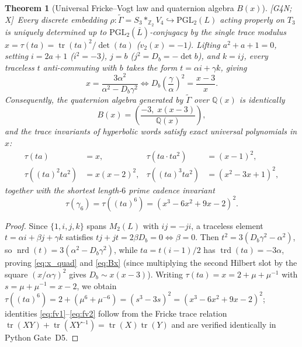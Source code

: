 \documentclass[11pt]{amsart}
\numberwithin{equation}{section}
\theoremstyle{plain}
\newtheorem{theorem}{Theorem}[section]
\theoremstyle{definition}\newtheorem{definition}[theorem]{Definition}
\theoremstyle{remark}\newtheorem{remark}[theorem]{Remark}
\newcommand{\Q}{\mathbb{Q}}
\newcommand{\Z}{\mathbb{Z}}
\newcommand{\PGL}{\mathrm{PGL}}
\newcommand{\nrd}{\operatorname{nrd}}
\newcommand{\trd}{\operatorname{trd}}
\newcommand{\ctag}[1]{\textup{\textsf{\scriptsize[#1]}}}
\begin{document}
\begin{theorem}[Universal Fricke--Vogt law and quaternion algebra $B(x)$]\label{thm:fricke_vogt}
\ctag{G4N; X}\ Every discrete embedding $\rho:\tilde{\Gamma}=S_3*_{\Z_2}V_4\hookrightarrow\PGL_2(L)$ acting properly on $T_3$ is uniquely determined up to $\PGL_2(\overline{L})$-conjugacy by the single trace modulus $x = \tau(ta) = \operatorname{tr}(ta)^2/\det(ta)$ ($v_2(x)=-1$). Lifting $a^2+a+1=0$, setting $i=2a+1$ ($i^2=-3$), $j=b$ ($j^2=D_b=-\det b$), and $k=ij$, every traceless $t$ anti-commuting with $b$ takes the form $t=\alpha i + \gamma k$, giving
\begin{equation}\label{eq:x_quad}
x = \frac{3\alpha^2}{\alpha^2 - D_b \gamma^2} \iff D_b\left(\frac{\gamma}{\alpha}\right)^2 = \frac{x - 3}{x}.
\end{equation}
Consequently, the quaternion algebra generated by $\tilde{\Gamma}$ over $\Q(x)$ is identically
\begin{equation}\label{eq:Bx}
B(x) = \left(\frac{-3,\; x(x-3)}{\Q(x)}\right),
\end{equation}
and the trace invariants of hyperbolic words satisfy exact universal polynomials in $x$:
\begin{align}
\tau(ta) &= x, & \tau(ta\cdot ta^2) &= (x-1)^2, \label{eq:fv1}\\
\tau((ta)^2 ta^2) &= x(x-2)^2, & \tau((ta)^3 ta^2) &= (x^2-3x+1)^2, \label{eq:fv2}
\end{align}
together with the shortest length-$6$ prime cadence invariant
\begin{equation}\label{eq:fv3}
\tau(\gamma_6) = \tau((ta)^6) = (x^3 - 6x^2 + 9x - 2)^2.
\end{equation}
\end{theorem}
\begin{proof}
Since $\{1,i,j,k\}$ spans $M_2(L)$ with $ij=-ji$, a traceless element $t=\alpha i+\beta j+\gamma k$ satisfies $tj+jt=2\beta D_b=0\iff \beta=0$. Then $t^2 = 3(D_b\gamma^2-\alpha^2)$, so $\nrd(t)=3(\alpha^2-D_b\gamma^2)$, while $ta=t(i-1)/2$ has $\trd(ta)=-3\alpha$, proving \eqref{eq:x_quad} and \eqref{eq:Bx} (since multiplying the second Hilbert slot by the square $(x/\alpha\gamma)^2$ gives $D_b\sim x(x-3)$). Writing $\tau(ta)=x=2+\mu+\mu^{-1}$ with $s=\mu+\mu^{-1}=x-2$, we obtain $\tau((ta)^6) = 2+(\mu^6+\mu^{-6}) = (s^3-3s)^2 = (x^3-6x^2+9x-2)^2$; identities \eqref{eq:fv1}--\eqref{eq:fv2} follow from the Fricke trace relation $\operatorname{tr}(XY)+\operatorname{tr}(XY^{-1})=\operatorname{tr}(X)\operatorname{tr}(Y)$ and are verified identically in Python Gate~D5.
\end{proof}
\end{document}
